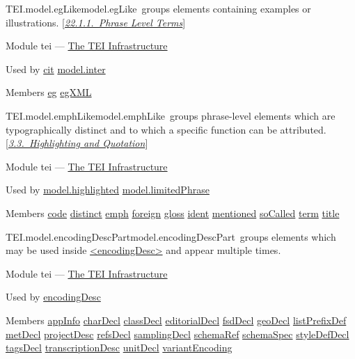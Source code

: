 \begin{reflist}
\item[]\begin{specHead}{TEI.model.egLike}{model.egLike} groups elements containing examples or illustrations. [\textit{\hyperref[TDphraseTE]{22.1.1.\ Phrase Level Terms}}]\end{specHead} 
    \item[{Module}]
  tei — \hyperref[ST]{The TEI Infrastructure}
    \item[{Used by}]
  \hyperref[TEI.cit]{cit} \hyperref[TEI.model.inter]{model.inter}
    \item[{Members}]
  \hyperref[TEI.eg]{eg} \hyperref[TEI.egXML]{egXML}
\end{reflist}  
\begin{reflist}
\item[]\begin{specHead}{TEI.model.emphLike}{model.emphLike} groups phrase-level elements which are typographically distinct and to which a specific function can be attributed. [\textit{\hyperref[COHQ]{3.3.\ Highlighting and Quotation}}]\end{specHead} 
    \item[{Module}]
  tei — \hyperref[ST]{The TEI Infrastructure}
    \item[{Used by}]
  \hyperref[TEI.model.highlighted]{model.highlighted} \hyperref[TEI.model.limitedPhrase]{model.limitedPhrase}
    \item[{Members}]
  \hyperref[TEI.code]{code} \hyperref[TEI.distinct]{distinct} \hyperref[TEI.emph]{emph} \hyperref[TEI.foreign]{foreign} \hyperref[TEI.gloss]{gloss} \hyperref[TEI.ident]{ident} \hyperref[TEI.mentioned]{mentioned} \hyperref[TEI.soCalled]{soCalled} \hyperref[TEI.term]{term} \hyperref[TEI.title]{title}
\end{reflist}  
\begin{reflist}
\item[]\begin{specHead}{TEI.model.encodingDescPart}{model.encodingDescPart} groups elements which may be used inside \hyperref[TEI.encodingDesc]{<encodingDesc>} and appear multiple times.\end{specHead} 
    \item[{Module}]
  tei — \hyperref[ST]{The TEI Infrastructure}
    \item[{Used by}]
  \hyperref[TEI.encodingDesc]{encodingDesc}
    \item[{Members}]
  \hyperref[TEI.appInfo]{appInfo} \hyperref[TEI.charDecl]{charDecl} \hyperref[TEI.classDecl]{classDecl} \hyperref[TEI.editorialDecl]{editorialDecl} \hyperref[TEI.fsdDecl]{fsdDecl} \hyperref[TEI.geoDecl]{geoDecl} \hyperref[TEI.listPrefixDef]{listPrefixDef} \hyperref[TEI.metDecl]{metDecl} \hyperref[TEI.projectDesc]{projectDesc} \hyperref[TEI.refsDecl]{refsDecl} \hyperref[TEI.samplingDecl]{samplingDecl} \hyperref[TEI.schemaRef]{schemaRef} \hyperref[TEI.schemaSpec]{schemaSpec} \hyperref[TEI.styleDefDecl]{styleDefDecl} \hyperref[TEI.tagsDecl]{tagsDecl} \hyperref[TEI.transcriptionDesc]{transcriptionDesc} \hyperref[TEI.unitDecl]{unitDecl} \hyperref[TEI.variantEncoding]{variantEncoding}
\end{reflist}  
